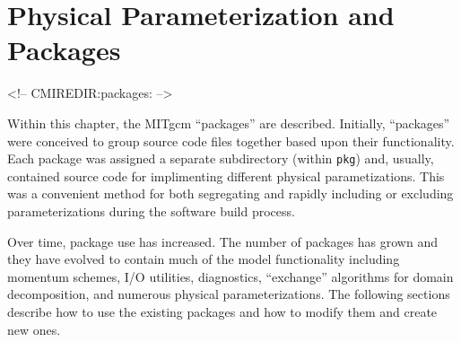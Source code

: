 
\chapter{Physical Parameterization and Packages}
\begin{rawhtml}
<!-- CMIREDIR:packages: -->
\end{rawhtml}

Within this chapter, the MITgcm ``packages'' are described.
Initially, ``packages'' were conceived to group source code files
together based upon their functionality.  Each package was assigned a
separate subdirectory (within \texttt{pkg}) and, usually, contained
source code for implimenting different physical parametizations.  This
was a convenient method for both segregating and rapidly including or
excluding parameterizations during the software build process.

Over time, package use has increased.  The number of packages has
grown and they have evolved to contain much of the model functionality
including momentum schemes, I/O utilities, diagnostics, ``exchange''
algorithms for domain decomposition, and numerous physical
parameterizations.  The following sections describe how to use the
existing packages and how to modify them and create new ones.


\newpage


\newpage


\newpage


\newpage


\newpage


\newpage


\newpage


\newpage


\newpage


\newpage


\newpage


